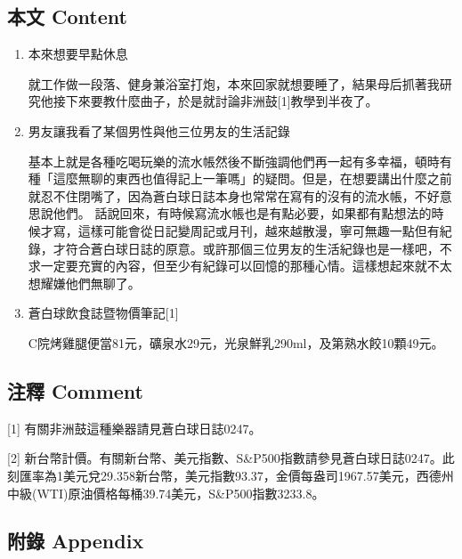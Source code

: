 \documentclass[
]{article}
\begin{document}
\hypertarget{ux672cux6587-content-26}{%
\subsection{本文 Content}\label{ux672cux6587-content-26}}

\begin{enumerate}
\def\labelenumi{\arabic{enumi}.}
\item
  本來想要早點休息

  就工作做一段落、健身兼浴室打炮，本來回家就想要睡了，結果母后抓著我研究他接下來要教什麼曲子，於是就討論非洲鼓{[}1{]}教學到半夜了。
\item
  男友讓我看了某個男性與他三位男友的生活記錄

  基本上就是各種吃喝玩樂的流水帳然後不斷強調他們再一起有多幸福，頓時有種「這麼無聊的東西也值得記上一筆嗎」的疑問。但是，在想要講出什麼之前就忍不住閉嘴了，因為蒼白球日誌本身也常常在寫有的沒有的流水帳，不好意思說他們。
  話說回來，有時候寫流水帳也是有點必要，如果都有點想法的時候才寫，這樣可能會從日記變周記或月刊，越來越散漫，寧可無趣一點但有紀錄，才符合蒼白球日誌的原意。或許那個三位男友的生活紀錄也是一樣吧，不求一定要充實的內容，但至少有紀錄可以回憶的那種心情。這樣想起來就不太想耀嫌他們無聊了。
\item
  蒼白球飲食誌暨物價筆記{[}1{]}

  C院烤雞腿便當81元，礦泉水29元，光泉鮮乳290ml，及第熟水餃10顆49元。
\end{enumerate}

\hypertarget{ux6ce8ux91cb-comment-26}{%
\subsection{注釋 Comment}\label{ux6ce8ux91cb-comment-26}}

{[}1{]} 有關非洲鼓這種樂器請見蒼白球日誌0247。

{[}2{]}
新台幣計價。有關新台幣、美元指數、S\&P500指數請參見蒼白球日誌0247。此刻匯率為1美元兌29.358新台幣，美元指數93.37，金價每盎司1967.57美元，西德州中級(WTI)原油價格每桶39.74美元，S\&P500指數3233.8。

\hypertarget{ux9644ux9304-appendix-26}{%
\subsection{附錄 Appendix}\label{ux9644ux9304-appendix-26}}
\end{document}
